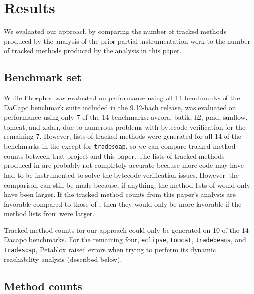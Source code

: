 \chapter{Results}
We evaluated our approach by comparing the number of tracked methods produced by the analysis of the prior partial instrumentation work to the number of tracked methods produced by the analysis in this paper.

\section{Benchmark set}
While Phosphor \cite{phosphor_oopsla} was evaluated on performance using all 14 benchmarks of the  DaCapo benchmark suite \cite{dacapobach} included in the 9.12-bach release, \cite{manoj_project} was evaluated on performance using only 7 of the 14 benchmarks: avrora, batik, h2, pmd, sunflow, tomcat, and xalan, due to numerous problems with bytecode verification for the remaining 7. However, lists of tracked methods were generated for all 14 of the benchmarks in the \cite{manoj_project} except for \texttt{tradesoap}, so we can compare tracked method counts between that project and this paper. The lists of tracked methods produced in \cite{manoj_project} are probably not completely accurate because more code may have had to be instrumented to solve the bytecode verification issues. However, the comparison can still be made because, if anything, the method lists of \cite{manoj_project} would only have been larger. If the tracked method counts from this paper's analysis are favorable compared to those of \cite{manoj_project}, then they would only be more favorable if the method lists from \cite{manoj_project} were larger.

Tracked method counts for our approach could only be generated on 10 of the 14 Dacapo benchmarks. For the remaining four, \texttt{eclipse}, \texttt{tomcat}, \texttt{tradebeans}, and \texttt{tradesoap}, Petablox raised errors when trying to perform its dynamic reachability analysis (described below). 

\section{Method counts}

